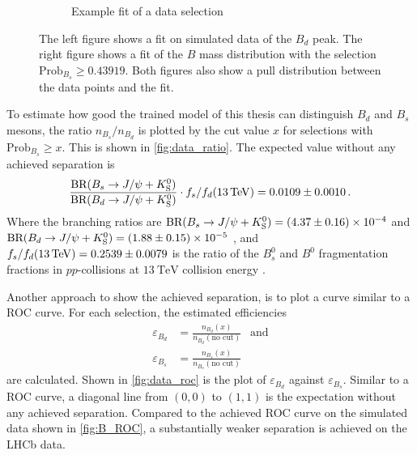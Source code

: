 \begin{figure}
\begin{subfigure}{0.5\textwidth}
        \caption{Example fit of a data selection}
        \label{fig:fit_example}
    \end{subfigure}%
    \caption{The left figure shows a fit on simulated data of the $B_d$ peak. The right figure shows a fit of the $B$ mass distribution with the selection $\text{Prob}_{B_s} \geq 0.43919$. Both figures also show a pull distribution between the data points and the fit.}
\end{figure}

To estimate how good the trained model of this thesis can distinguish $B_d$ and $B_s$ mesons, the ratio $n_{B_s}/n_{B_d}$ is plotted by the cut value $x$ for selections with $\text{Prob}_{B_s} \geq x$. 
This is shown in \cref{fig:data_ratio}.
The expected value without any achieved separation is 
\begin{equation*}
    \frac{\text{BR}(B_s \rightarrow J/\psi + K^0_\text{S})}{\text{BR}(B_d \rightarrow J/\psi + K^0_\text{S})} \cdot 
    f_s/f_d(\qty{13}{\TeV}) = \num{0.0109\pm0.0010} \, .
\end{equation*}
Where the branching ratios are $\text{BR}(B_s \rightarrow J/\psi + K^0_\text{S}) = \num{4.37\pm0.16e-4}$ and $\text{BR}(B_d \rightarrow J/\psi + K^0_\text{S}) = \num{1.88\pm0.15e-5}$ \cite{pdg}, and $f_s/f_d(\qty{13}{\TeV}) = \num{0.2539\pm0.0079}$ is the ratio of the $B^0_s$ and $B^0$ fragmentation fractions in $pp$-collisions at $\qty{13}{\TeV}$ collision energy \cite{fsfd}.

Another approach to show the achieved separation, is to plot a curve similar to a ROC curve. 
For each selection, the estimated efficiencies
\begin{align*}
    \varepsilon_{B_d} &= \frac{n_{B_d}(x)}{n_{B_d}(\text{no cut})} \: \: \text{ and} \\
    \varepsilon_{B_s} &= \frac{n_{B_s}(x)}{n_{B_s}(\text{no cut})}
\end{align*}
are calculated. Shown in \cref{fig:data_roc} is the plot of $\varepsilon_{B_d}$ against $\varepsilon_{B_s}$.
Similar to a ROC curve, a diagonal line from $(0,0)$ to $(1,1)$ is the expectation without any achieved separation.
Compared to the achieved ROC curve on the simulated data shown in \cref{fig:B_ROC}, a substantially weaker separation is achieved on the LHCb data.

